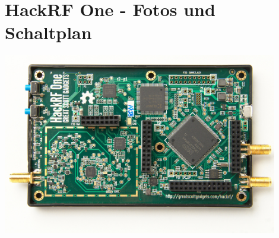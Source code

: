 
\section{HackRF One - Fotos und Schaltplan}
\includegraphics[angle=270,width=0.9\textwidth]{content/appendix/HackRF-One-fd0-0009.jpeg}


 